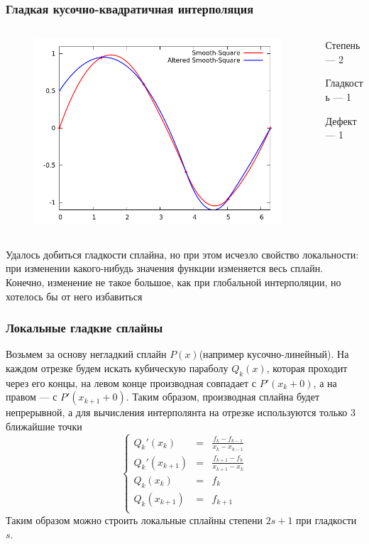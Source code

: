 \documentclass[aspectratio=169,unicode]{beamer}
\begin{document}
\begin{frame}
\frametitle{Гладкая кусочно-квадратичная интерполяция}
	\begin{columns}[c]
	\begin{column}{0.6\textwidth}
	\begin{figure}
	\center
	\includegraphics[height=.7\textheight]{spline2_1.png}%
	\end{figure}
	\end{column}
	\begin{column}{0.4\textwidth}
	Степень --- 2

	Гладкость --- 1

	Дефект --- 1
	\end{column}
	\end{columns}

	Удалось добиться гладкости сплайна, но при этом исчезло свойство локальности:
	при изменении какого-нибудь значения функции изменяется весь сплайн. Конечно, изменение не такое
	большое, как при глобальной интерполяции, но хотелось бы от него избавиться
\end{frame}

\begin{frame}
\frametitle{Локальные гладкие сплайны}
	Возьмем за основу негладкий сплайн $P(x)$(например кусочно-линейный).
	На каждом отрезке будем искать кубическую параболу $Q_k(x)$, которая проходит через его концы,
	на левом конце производная совпадает с $P'(x_k+0)$, а на правом --- с $P'(x_{k+1}+0)$.
	Таким образом, производная сплайна будет непрерывной, а для вычисления интерполянта на
	отрезке используются только 3 ближайшие точки
	$$
	\left\{
	\begin{array}{lcl}
		Q_k'(x_k) &=& \frac{f_{k}-f_{k-1}}{x_k-x_{k-1}}\\
		Q_k'(x_{k+1}) &=& \frac{f_{k+1}-f_{k}}{x_{k+1}-x_{k}}\\
		Q_k(x_k) &=& f_k\\
		Q_k(x_{k+1}) &=& f_{k+1}\\
	\end{array}
	\right.
	$$
	Таким образом можно строить локальные сплайны степени $2s+1$ при гладкости $s$.
\end{frame}
\end{document}
